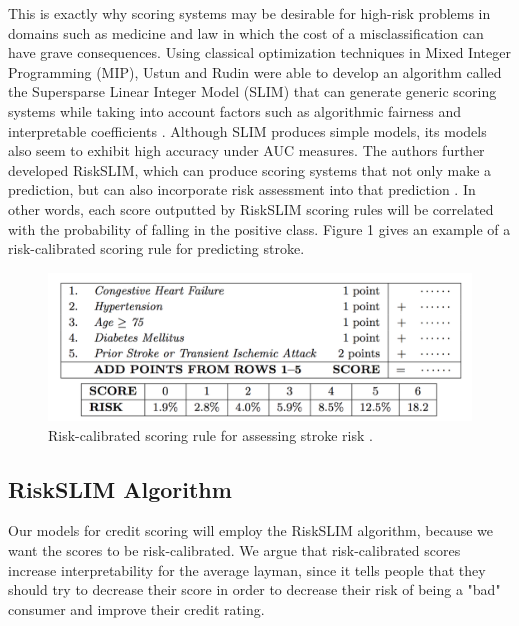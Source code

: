 \documentclass[11pt, margin=1in]{article}
\begin{document}
This is exactly why scoring systems may be desirable for high-risk problems in domains such as medicine and law \cite{slim, risk-slim} in which the cost of a misclassification can have grave consequences.  Using classical optimization techniques in Mixed Integer Programming (MIP), Ustun and Rudin were able to develop an algorithm called the Supersparse Linear Integer Model (SLIM) that can generate generic scoring systems while taking into account factors such as algorithmic fairness and interpretable coefficients \cite{slim}.  Although SLIM produces simple models, its models also seem to exhibit high accuracy under AUC measures.  The authors further developed RiskSLIM, which can produce scoring systems that not only make a prediction, but can also incorporate risk assessment into that prediction \cite{risk-slim}.  In other words, each score outputted by RiskSLIM scoring rules will be correlated with the probability of falling in the positive class.  Figure 1 gives an example of a risk-calibrated scoring rule for predicting stroke.  

\begin{figure}
\begin{center}
\includegraphics[scale=0.5]{img/scoring-rule}
\end{center}
\caption{Risk-calibrated scoring rule for assessing stroke risk \cite{stroke}.}
\end{figure}

\subsection{RiskSLIM Algorithm}

Our models for credit scoring will employ the RiskSLIM algorithm, because we want the scores to be risk-calibrated.  We argue that risk-calibrated scores increase interpretability for the average layman, since it tells people that they should try to decrease their score in order to decrease their risk of being a "bad" consumer and improve their credit rating.   
\end{document}
